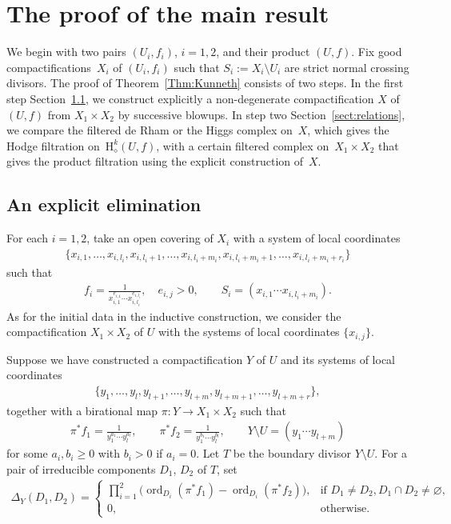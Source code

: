 \documentclass[pdftex]{sigma}
\newcommand{\coH}{\mathrm{H}}
\newcommand{\dRH}{\diamond}
\newcommand{\cpt}{compactification}
\newcommand{\ord}{\operatorname{ord}}
\begin{document}
\section{The proof of the main result}\label{sect:Resolution}

We begin with two pairs $(U_i,f_i)$, $i=1,2$, and their product $(U,f)$. Fix good {\cpt}s~$X_i$ of $(U_i,f_i)$ such that $S_i := X_i\setminus U_i$ are strict normal crossing divisors. The proof of Theorem~\ref{Thm:Kunneth} consists of two steps. In the first step Section~\ref{sect:elim}, we construct explicitly a non-degenerate {\cpt} $X$ of~$(U,f)$ from $X_1\times X_2$ by successive blowups. In step two Section~\ref{sect:relations}, we compare the filtered de Rham or the Higgs complex on~$X$, which gives the Hodge filtration on~$\coH_\dRH^k(U,f)$, with a certain filtered complex on~$X_1\times X_2$ that gives the product filtration using the explicit construction of~$X$.

\subsection{An explicit elimination}\label{sect:elim}

For each $i=1,2$, take an open covering of $X_i$ with a system of local coordinates
\begin{gather*} \{ x_{i,1},\dots, x_{i,l_i}, 	x_{i,l_i+1},\dots,x_{i,l_i+m_i}, 	x_{i,l_i+m_i+1},\dots,x_{i,l_i+m_i+r_i} \} \end{gather*}
such that
\begin{gather*} f_i = \frac{1}{x_{i,1}^{e_{i,1}}\cdots x_{i,l_i}^{e_{i,l_i}}}, \quad e_{i,j} > 0, \qquad S_i = (x_{i,1}\cdots x_{i,l_i+m_i}). \end{gather*}
As for the initial data in the inductive construction, we consider the {\cpt} $X_1\times X_2$ of $U$ with the systems of local coordinates $\{x_{i,j}\}$.

Suppose we have constructed a {\cpt} $Y$ of $U$ and its systems of local coordinates
\begin{gather}\label{eq:Y_LocCoor}
\{ y_1,\dots, y_l, y_{l+1}, \dots, y_{l+m},	y_{l+m+1}, \dots, y_{l+m+r} \},
\end{gather}
together with a birational map $\pi\colon Y \to X_1\times X_2$ such that
\begin{gather}\label{eq:Y_LocBeh}
\pi^*f_1 = \frac{1}{y_1^{a_1}\cdots y_l^{a_l}}, \qquad \pi^*f_2 = \frac{1}{y_1^{b_1}\cdots y_l^{b_l}}, \qquad Y\setminus U = (y_1\cdots y_{l+m})
\end{gather}
for some $a_i,b_i \geq 0$ with $b_i >0$ if $a_i = 0$. Let $T$ be the boundary divisor $Y\setminus U$. For a pair of irreducible components $D_1$, $D_2$ of $T$, set
\begin{gather*} \Delta_Y(D_1,D_2) = \begin{cases}
\displaystyle \prod_{i=1}^2\big(\ord_{D_i}(\pi^*f_1)-\ord_{D_i}(\pi^*f_2)\big), 	& \text{if $D_1\neq D_2, D_1\cap D_2 \neq \varnothing$}, \\
0, & \text{otherwise}. \end{cases}\end{gather*}
\end{document}
